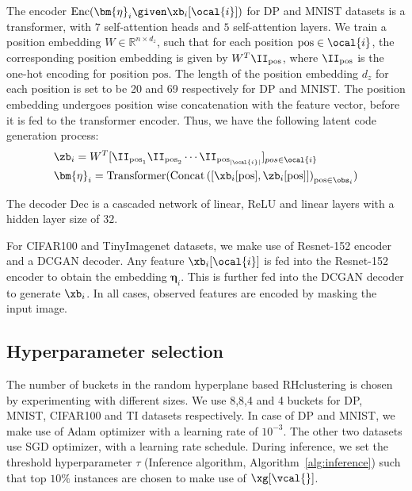 \documentclass[letterpaper]{article}
\begin{document}
The encoder $\text{Enc}(\bm{\eta}_i \given \xb_i[\ocal{i}])$ for DP and MNIST datasets is a transformer, with $7$ self-attention heads and $5$ self-attention layers. We train a position embedding $W \in \mathbb{R}^{n \times d_z}$, such that for each position $\text{pos}\in \ocal{i}$, the corresponding position embedding is given by $W^T \II_{\text{pos}}$, where $\II_{\text{pos}}$ is the one-hot encoding for position $\text{pos}$. The length of the position embedding $d_z$ for each position is set to be 20 and 69 respectively for DP and MNIST. The position embedding undergoes position wise concatenation with the feature vector, before it is fed to the transformer encoder. 
Thus, we have the following latent code generation process:
\begin{align}
&\zb_i = W^T[\II_{\text{pos}_1} \II_{\text{pos}_2} \cdots \II_{\text{pos}_{|\ocal{i}|}}]_{pos \in \ocal{i}}\\
&\bm{\eta}_i=  \text{Transformer}(\text{Concat}\left([\xb_i[\text{pos}],\zb_i[\text{pos}]]\right)_{\text{pos} \in \obs_i})
\end{align}



The decoder $\text{Dec}$ is a cascaded network of linear, ReLU and linear layers with a hidden layer size of $32$. 

 For CIFAR100 and TinyImagenet datasets, we make use of Resnet-152 encoder and a DCGAN decoder. Any feature $\xb_i[\ocal{i}]$ is fed into the Resnet-152 encoder to obtain the embedding $\bm{\eta}_i$. This is further fed into the DCGAN decoder to generate $\xb_i$. In all cases, observed features are encoded by masking the input image. 


\subsection{Hyperparameter selection}
The number of buckets in the random hyperplane based RHclustering is chosen by experimenting with different sizes. We use 8,8,4 and 4 buckets for DP, MNIST, CIFAR100 and TI datasets respectively.
%
In case of DP and MNIST, we make use of Adam optimizer with a learning rate of $10^{-3}$. The other two datasets use SGD optimizer, with a learning rate schedule. During inference, we set the threshold hyperparameter $\tau$ (Inference algorithm, Algorithm~\ref{alg:inference}) such that 
top $10\%$ instances are chosen to make use of $\xg[\vcal{}]$.
\end{document}
